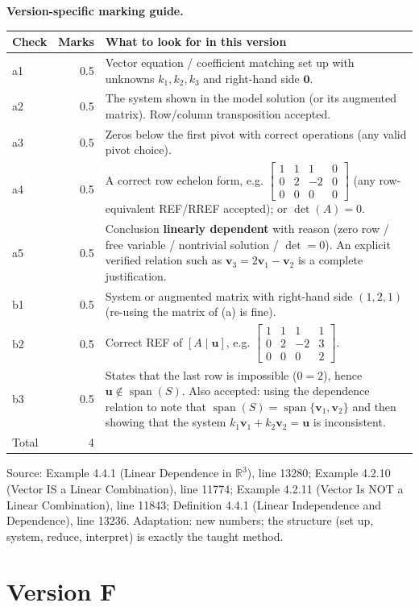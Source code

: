 \documentclass[11pt,a4paper]{article}
\newcommand{\Src}[1]{{\footnotesize\color{black!65}Source: #1}}
\begin{document}
\textbf{Version-specific marking guide.}\par
\begin{tabularx}{\linewidth}{@{}l r >{\raggedright\arraybackslash}X@{}}\toprule Check & Marks & What to look for in this version\\\midrule
a1 & 0.5 & Vector equation / coefficient matching set up with unknowns $k_1,k_2,k_3$ and right-hand side $\mathbf{0}$.\\
a2 & 0.5 & The system shown in the model solution (or its augmented matrix). Row/column transposition accepted.\\
a3 & 0.5 & Zeros below the first pivot with correct operations (any valid pivot choice).\\
a4 & 0.5 & A correct row echelon form, e.g. $\left[\begin{array}{ccc|c} 1 & 1 & 1 & 0 \\ 0 & 2 & -2 & 0 \\ 0 & 0 & 0 & 0 \end{array}\right]$ (any row-equivalent REF/RREF accepted); or $\det(A)=0$.\\
a5 & 0.5 & Conclusion \textbf{linearly dependent} with reason (zero row / free variable / nontrivial solution / $\det=0$). An explicit verified relation such as $\mathbf{v}_3=2\mathbf{v}_1-\mathbf{v}_2$ is a complete justification.\\
b1 & 0.5 & System or augmented matrix with right-hand side $(1,2,1)$ (re-using the matrix of (a) is fine).\\
b2 & 0.5 & Correct REF of $[A\mid\mathbf{u}]$, e.g. $\left[\begin{array}{ccc|c} 1 & 1 & 1 & 1 \\ 0 & 2 & -2 & 3 \\ 0 & 0 & 0 & 2 \end{array}\right]$.\\
b3 & 0.5 & States that the last row is impossible ($0=2$), hence $\mathbf{u}\notin\operatorname{span}(S)$. Also accepted: using the dependence relation to note that $\operatorname{span}(S)=\operatorname{span}\{\mathbf{v}_1,\mathbf{v}_2\}$ and then showing that the system $k_1\mathbf{v}_1+k_2\mathbf{v}_2=\mathbf{u}$ is inconsistent.\\
\midrule Total & 4 & \\\bottomrule\end{tabularx}
\Src{Example 4.4.1 (Linear Dependence in $\mathbb{R}^3$), line 13280; Example 4.2.10 (Vector IS a Linear Combination), line 11774; Example 4.2.11 (Vector Is NOT a Linear Combination), line 11843; Definition 4.4.1 (Linear Independence and Dependence), line 13236. Adaptation: new numbers; the structure (set up, system, reduce, interpret) is exactly the taught method.}\par
\clearpage\section*{Version F}
\end{document}
